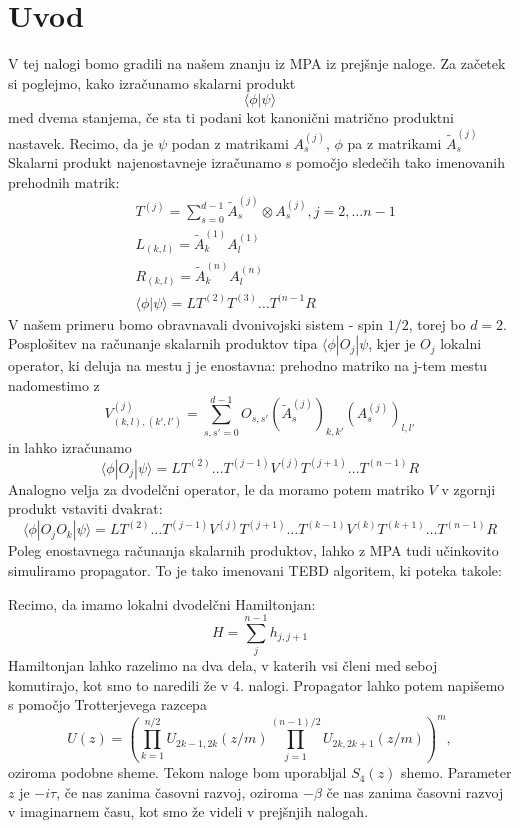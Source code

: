 \documentclass{article}
\begin{document}
\section*{Uvod}
V tej nalogi bomo gradili na našem znanju iz MPA iz prejšnje naloge.
Za začetek si poglejmo, kako izračunamo skalarni produkt
\begin{equation*}
\langle \phi | \psi \rangle
\end{equation*}
med dvema stanjema, če sta ti podani kot kanonični matrično produktni nastavek.
Recimo, da je $\psi$ podan z matrikami $A_s^{(j)}$, $\phi$ pa z matrikami $\tilde{A}_s^{(j)}$
Skalarni produkt najenostavneje izračunamo s pomočjo sledečih tako imenovanih prehodnih matrik:
\begin{align*}
&T^{(j)} = \sum_{s=0}^{d-1} \tilde{A}_s^{(j)} \otimes A_s^{(j)}, j=2, \dots n-1 \\
&L_{(k,l)} = \tilde{A}_k^{(1)} A_l^{(1)} \\
&R_{(k,l)} = \tilde{A}_k^{(n)} A_l^{(n)} \\
& \langle \phi | \psi \rangle = L T^{(2)} T^{(3)} \dots T^{(n-1} R
\end{align*}
V našem primeru bomo obravnavali dvonivojski sistem - spin $1/2$, torej bo $d=2$.
Posplošitev na računanje skalarnih produktov tipa $\langle \phi | O_j | \psi$, kjer je $O_j$ lokalni operator, ki deluja na mestu j je enostavna: prehodno matriko na j-tem mestu nadomestimo z
\begin{equation*}
V^{(j)}_{(k,l),(k',l')} = \sum_{s,s' = 0}^{d-1} O_{s,s'} (\tilde{A}_s^{(j)})_{k,k'} (A_s^{(j)})_{l,l'}
\end{equation*}
in lahko izračunamo
\begin{equation*}
\langle \phi | O_j | \psi \rangle = LT^{(2)} \dots T^{(j-1)} V^{(j)} T^{(j+1)} \dots T^{(n-1)} R
\end{equation*}
Analogno velja za dvodelčni operator, le da moramo potem matriko $V$ v zgornji produkt vstaviti dvakrat:
\begin{equation*}
\langle \phi | O_j O_k | \psi \rangle = LT^{(2)} \dots T^{(j-1)} V^{(j)} T^{(j+1)} \dots T^{(k-1)} V^{(k)} T^{(k+1)} \dots T^{(n-1)} R
\end{equation*}
Poleg enostavnega računanja skalarnih produktov, lahko z MPA tudi učinkovito simuliramo propagator. To je tako imenovani TEBD algoritem, ki poteka takole:

Recimo, da imamo lokalni dvodelčni Hamiltonjan:
\begin{equation*}
H = \sum_j^{n-1} h_{j,j+1}
\end{equation*}
Hamiltonjan lahko razelimo na  dva dela, v katerih vsi členi med seboj komutirajo, kot smo to naredili že v 4. nalogi. Propagator lahko potem napišemo s pomočjo Trotterjevega razcepa
\begin{equation*}
U(z) = \left( \prod_{k=1}^{n/2} U_{2k-1, 2k} (z/m) \prod_{j=1}^{(n-1)/2} U_{2k,2k+1} (z/m) \right)^m,
\end{equation*}
oziroma podobne sheme. Tekom naloge bom uporabljal $S_4(z)$ shemo. Parameter $z$ je $-i \tau$, če nas zanima časovni razvoj, oziroma $-\beta$ če nas zanima časovni razvoj v imaginarnem času, kot smo že videli v prejšnjih nalogah.
\end{document}
